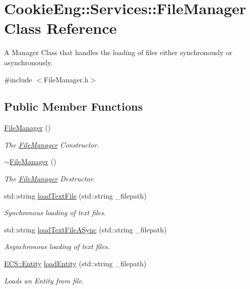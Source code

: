 \hypertarget{class_cookie_eng_1_1_services_1_1_file_manager}{}\section{Cookie\+Eng\+:\+:Services\+:\+:File\+Manager Class Reference}
\label{class_cookie_eng_1_1_services_1_1_file_manager}


A Manager Class that handles the loading of files either synchronously or asynchronously.  




{\ttfamily \#include $<$File\+Manager.\+h$>$}

\subsection*{Public Member Functions}
\begin{DoxyCompactItemize}
\item 
\hyperlink{class_cookie_eng_1_1_services_1_1_file_manager_a3ff15b868df81ba7d9964382f6474ef5}{File\+Manager} ()
\begin{DoxyCompactList}\small\item\em The \hyperlink{class_cookie_eng_1_1_services_1_1_file_manager}{File\+Manager} Constructor. \end{DoxyCompactList}\item 
\hyperlink{class_cookie_eng_1_1_services_1_1_file_manager_a51e133f4fd86a874129a63be191b91ba}{$\sim$\+File\+Manager} ()
\begin{DoxyCompactList}\small\item\em The \hyperlink{class_cookie_eng_1_1_services_1_1_file_manager}{File\+Manager} Destructor. \end{DoxyCompactList}\item 
std\+::string \hyperlink{class_cookie_eng_1_1_services_1_1_file_manager_a744bde422e66fcfbfcc379a21ae90500}{load\+Text\+File} (std\+::string \+\_\+filepath)
\begin{DoxyCompactList}\small\item\em Synchronous loading of text files. \end{DoxyCompactList}\item 
std\+::string \hyperlink{class_cookie_eng_1_1_services_1_1_file_manager_abf50a7b6eb9fa88a9557254acbd2d9cc}{load\+Text\+File\+A\+Sync} (std\+::string \+\_\+filepath)
\begin{DoxyCompactList}\small\item\em Asynchronous loading of text files. \end{DoxyCompactList}\item 
\hyperlink{class_cookie_eng_1_1_e_c_s_1_1_entity}{E\+C\+S\+::\+Entity} \hyperlink{class_cookie_eng_1_1_services_1_1_file_manager_aa9d81e3a19c47774c1c1f15f27e688a4}{load\+Entity} (std\+::string \+\_\+filepath)
\begin{DoxyCompactList}\small\item\em Loads an Entity from file. \end{DoxyCompactList}\end{DoxyCompactItemize}


